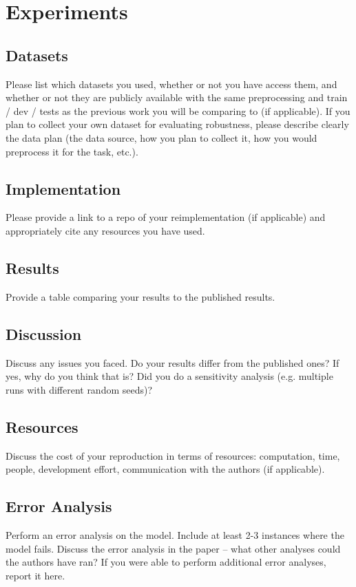 \documentclass[11pt,a4paper]{article}
\begin{document}
\section{Experiments}

\subsection{Datasets}
Please list which datasets you used, whether or not you have access them, and whether or not they are publicly available with the same preprocessing and train / dev / tests as the previous work you will be comparing to (if applicable). If you plan to collect your own dataset for evaluating robustness, please describe clearly the data plan (the data source, how you plan to collect it, how you would preprocess it for the task, etc.).

\subsection{Implementation} 
Please provide a link to a repo of your reimplementation (if applicable) and appropriately cite any resources you have used.

\subsection{Results}
Provide a table comparing your results to the published results.

\subsection{Discussion}
Discuss any issues you faced. Do your results differ from the published ones? If yes, why do you think that is? Did you do a sensitivity analysis (e.g. multiple runs with different random seeds)?

\subsection{Resources}
Discuss the cost of your reproduction in terms of resources: computation, time, people, development effort, communication with the authors (if applicable).


\subsection{Error Analysis}
Perform an error analysis on the model. Include at least 2-3 instances where the model fails. Discuss the error analysis in the paper -- what other analyses could the authors have ran? If you were able to perform additional error analyses, report it here.
\end{document}
